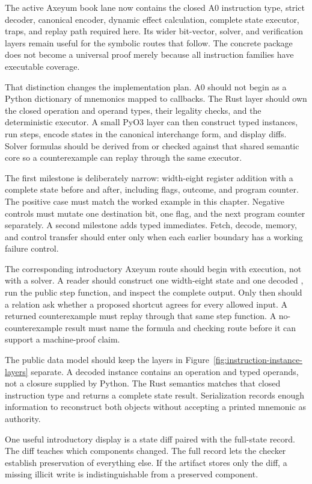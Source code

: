 The active Axeyum book lane now contains the closed A0 instruction type,
strict decoder, canonical encoder, dynamic effect calculation, complete state
executor, traps, and replay path required here. Its wider bit-vector, solver,
and verification layers remain useful for the symbolic routes that follow.
The concrete package does not become a universal proof merely because all
instruction families have executable coverage.

That distinction changes the implementation plan. A0 should not begin as a
Python dictionary of mnemonics mapped to callbacks. The Rust layer should own
the closed operation and operand types, their legality checks, and the
deterministic executor. A small PyO3 layer can then construct typed instances,
run steps, encode states in the canonical interchange form, and display
diffs. Solver formulas should be
derived from or checked against that shared semantic core so a counterexample
can replay through the same executor.

The first milestone is deliberately narrow: width-eight register addition
with a complete state before and after, including flags, outcome, and program
counter. The positive case must match the worked example in this chapter.
Negative controls must mutate one destination bit, one flag, and the next
program counter separately. A second milestone adds typed immediates. Fetch,
decode, memory, and control transfer should enter only when each earlier
boundary has a working failure control.

The corresponding introductory Axeyum route should begin with execution, not
with a solver. A reader should construct one width-eight state and one decoded
, run the public step function, and inspect the complete output.
Only then should a relation ask whether a proposed shortcut agrees for every
allowed input. A returned counterexample must replay through that same step
function. A no-counterexample result must name the formula and checking route
before it can support a machine-proof claim.

The public data model should keep the layers in
Figure~\ref{fig:instruction-instance-layers} separate. A decoded instance
contains an operation and typed operands, not a closure supplied by Python.
The Rust semantics matches that closed instruction type and returns a complete
state result. Serialization records enough information to reconstruct both
objects without accepting a printed mnemonic as authority.

One useful introductory display is a state diff paired with the full-state
record. The diff teaches which components changed. The full record lets the
checker establish preservation of everything else. If the artifact stores
only the diff, a missing illicit write is indistinguishable from a preserved
component.


